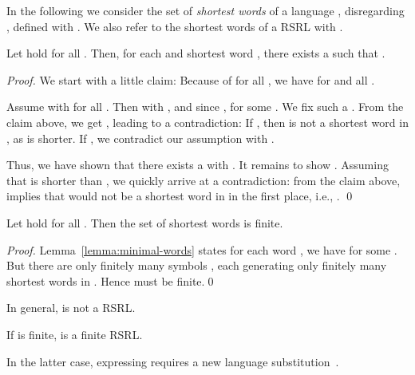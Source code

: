 \documentclass[envcountsame]{llncs}
\newcommand{\RegularlyGeneratedLanguageSetAbbrev}{RSRL\xspace}
\begin{document}
In the following we consider the set  of \emph{shortest words}
of a language , disregarding , defined with
.
We also refer to the shortest words  of a \RegularlyGeneratedLanguageSetAbbrev  with
. 

\begin{lemma}
  \label{lemma:minimal-words}
  Let  hold for all .
Then, for each  and shortest word , there exists a  such that .
\end{lemma}

\begin{proof}
  We start with a little claim: 
Because of  for all
  , we have 
  for  and all .


  Assume  with  for all
  .
Then  with , and since
  ,  for some . We
  fix such a .
From the claim above, we get , leading to a contradiction:
If , then  is not a shortest word in
  , as  is shorter. 
If , we contradict our assumption with
  .  


  Thus, we have shown that there exists a  with
  .
It remains to show .
Assuming that  is
  shorter than , we quickly arrive at a contradiction:
 from the claim above,
  implies that  would not be a shortest word in
   in the first place, i.e.,
  . 
\qed
\end{proof}


\begin{corollary}
  \label{cor:finite-number-of-shortest-words}
  Let  hold for all .
Then the set of shortest words  is finite.
\end{corollary}

\begin{proof}
  Lemma~\ref{lemma:minimal-words} states for each word , we have  for some
  .
But there are only finitely many symbols , each
  generating only finitely many shortest words in
  . 
Hence  must be finite.\qed
\end{proof}




\begin{proposition}
  \label{prop:closure:pw-star}
  \begin{inparaenum}
  \item\label{prop:closure:pw-star:a} In general,
     is not a \RegularlyGeneratedLanguageSetAbbrev.
  \item\label{prop:closure:pw-star:b} If  is finite,
     is a finite \RegularlyGeneratedLanguageSetAbbrev.
  \item\label{prop:closure:pw-star:c} In the latter case, expressing
     requires a new language
    substitution~.
\end{inparaenum}
\end{proposition}
\end{document}
